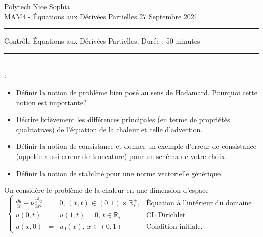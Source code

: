 \documentclass[12pt,a4paper]{article}
\begin{document}
 \hfill Polytech Nice Sophia \\
\noindent MAM4 - \'Equations aux D\'eriv\'ees Partielles \hfill 
27 Septembre 2021 \\

\hrule

\vspace{1cm}
\centerline {\large \sc Contrôle \'Equations aux D\'eriv\'ees Partielles. Dur\'ee : 50 minutes}
\vspace{1cm}


\hrule
\vspace{1cm}
\\

:
\begin{itemize}
\item Définir la notion de problème bien posé au sens de Hadamard. Pourquoi cette notion est importante?
\item Décrire brièvement les différences principales (en terme de propriétés qualitatives) de l'équation de la chaleur et celle d'advection.
\item Définir la notion de consistance et donner un exemple d'erreur de consistance (appelée aussi erreur de troncature) pour un schéma de votre choix.
\item Définir la notion de stabilité pour une norme vectorielle générique. 
\end{itemize}

\noindent On consid\`ere le probl\`eme de la chaleur en une dimension
d'espace 
\begin{equation}\label{eq:heat}
\left\{\begin{array}{lcll}
\displaystyle\frac{\partial u}{\partial t} - \nu \frac{\partial^2 u}{\partial x^2}&=
&0,\,
(x,t)\in (0,1)\times\mathbb{R}_*^+, & \text{Équation à l'intérieur du domaine } \\
u(0,t)&=&u(1,t) = 0,\, t\in \mathbb{R}_*^+ &\text{CL Dirichlet}\\
u(x,0)&=&u_0(x),\, x\in (0,1) & \text {Condition initiale}.
\end{array}\right.
\end{equation}

\end{document}
